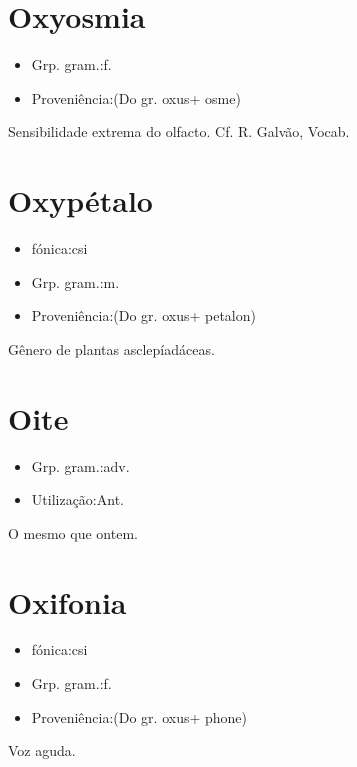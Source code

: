 \section{Oxyosmia}
\begin{itemize}
\item {Grp. gram.:f.}
\end{itemize}
\begin{itemize}
\item {Proveniência:(Do gr. \textunderscore oxus\textunderscore  + \textunderscore osme\textunderscore )}
\end{itemize}
Sensibilidade extrema do olfacto. Cf. R. Galvão, \textunderscore Vocab.\textunderscore 
\section{Oxypétalo}
\begin{itemize}
\item {fónica:csi}
\end{itemize}
\begin{itemize}
\item {Grp. gram.:m.}
\end{itemize}
\begin{itemize}
\item {Proveniência:(Do gr. \textunderscore oxus\textunderscore  + \textunderscore petalon\textunderscore )}
\end{itemize}
Gênero de plantas asclepíadáceas.
\section{Oite}
\begin{itemize}
\item {Grp. gram.:adv.}
\end{itemize}
\begin{itemize}
\item {Utilização:Ant.}
\end{itemize}
O mesmo que \textunderscore ontem\textunderscore .
\section{Oxifonia}
\begin{itemize}
\item {fónica:csi}
\end{itemize}
\begin{itemize}
\item {Grp. gram.:f.}
\end{itemize}
\begin{itemize}
\item {Proveniência:(Do gr. \textunderscore oxus\textunderscore  + \textunderscore phone\textunderscore )}
\end{itemize}
Voz aguda.
